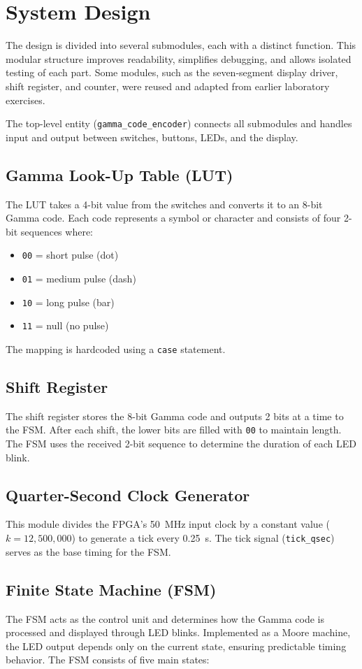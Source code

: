 \documentclass[conference]{IEEEtran}
\begin{document}
\section{System Design}
The design is divided into several submodules, each with a distinct function. This modular structure improves readability, simplifies debugging, and allows isolated testing of each part. Some modules, such as the seven-segment display driver, shift register, and counter, were reused and adapted from earlier laboratory exercises.

The top-level entity (\texttt{gamma\_code\_encoder}) connects all submodules and handles input and output between switches, buttons, LEDs, and the display.

\subsection{Gamma Look-Up Table (LUT)}
The LUT takes a 4-bit value from the switches and converts it to an 8-bit Gamma code. Each code represents a symbol or character and consists of four 2-bit sequences where:
\begin{itemize}
    \item \texttt{00} = short pulse (dot)
    \item \texttt{01} = medium pulse (dash)
    \item \texttt{10} = long pulse (bar)
    \item \texttt{11} = null (no pulse)
\end{itemize}
The mapping is hardcoded using a \texttt{case} statement.

\subsection{Shift Register}
The shift register stores the 8-bit Gamma code and outputs 2 bits at a time to the FSM. After each shift, the lower bits are filled with \texttt{00} to maintain length. The FSM uses the received 2-bit sequence to determine the duration of each LED blink.

\subsection{Quarter-Second Clock Generator}
This module divides the FPGA’s 50~MHz input clock by a constant value ($k = 12{,}500{,}000$) to generate a tick every 0.25~s. The tick signal (\texttt{tick\_qsec}) serves as the base timing for the FSM.

\subsection{Finite State Machine (FSM)}
The FSM acts as the control unit and determines how the Gamma code is processed and displayed through LED blinks. Implemented as a Moore machine, the LED output depends only on the current state, ensuring predictable timing behavior. The FSM consists of five main states:
\end{document}
